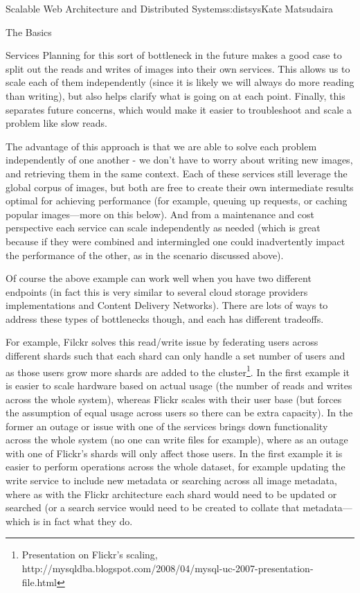 \begin{aosachapter}{Scalable Web Architecture and Distributed Systems}{s:distsys}{Kate Matsudaira}
\begin{aosasect1}{The Basics}
\begin{aosasect2}{Services}
Planning for this sort of bottleneck in the future makes a good case
to split out the reads and writes of images into their own
services. This allows us to scale each of them independently (since it
is likely we will always do more reading than writing), but also helps
clarify what is going on at each point. Finally, this separates future
concerns, which would make it easier to troubleshoot and scale a
problem like slow reads.


The advantage of this approach is that we are able to solve each
problem independently of one another - we don't have to worry about
writing new images, and retrieving them in the same context. Each of
these services still leverage the global corpus of images, but both
are free to create their own intermediate results optimal for
achieving performance (for example, queuing up requests, or caching
popular images---more on this below). And from a maintenance and cost
perspective each service can scale independently as needed (which is
great because if they were combined and intermingled one could
inadvertently impact the performance of the other, as in the scenario
discussed above).

Of course the above example can work well when you have two different
endpoints (in fact this is very similar to several cloud storage
providers implementations and Content Delivery Networks). There are
lots of ways to address these types of bottlenecks though, and each
has different tradeoffs.

For example, Filckr solves this read/write issue by federating users
across different shards such that each shard can only handle a set
number of users and as those users grow more shards are added to the
cluster\footnote{Presentation on Flickr's scaling,
  http://mysqldba.blogspot.com/2008/04/mysql-uc-2007-presentation-file.html}. In
the first example it is easier to scale hardware based on actual usage
(the number of reads and writes across the whole system), whereas
Flickr scales with their user base (but forces the assumption of equal
usage across users so there can be extra capacity). In the former an
outage or issue with one of the services brings down functionality
across the whole system (no one can write files for example), where as
an outage with one of Flickr's shards will only affect those users. In
the first example it is easier to perform operations across the whole
dataset, for example updating the write service to include new
metadata or searching across all image metadata, where as with the
Flickr architecture each shard would need to be updated or searched
(or a search service would need to be created to collate that
metadata---which is in fact what they do.


\end{aosasect2}
\end{aosasect1}
\end{aosachapter}
